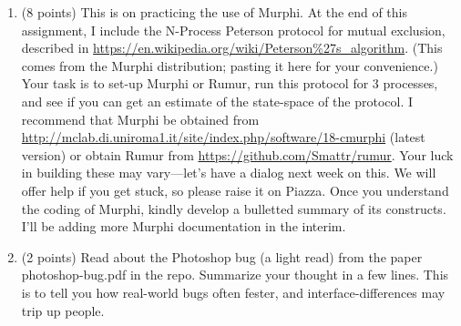 \documentclass[11pt]{article}
\begin{document}
\begin{enumerate}
  
\item (8 points)
  This is on practicing the use of Murphi.
  At the end of this assignment, I include the N-Process Peterson protocol
  for mutual exclusion, described in
  \url{https://en.wikipedia.org/wiki/Peterson%27s_algorithm}.
  (This comes from the Murphi distribution; pasting it here for your
  convenience.)
  Your task is to set-up Murphi or Rumur, run this protocol for 3 processes, and
  see if you can get an estimate of the state-space of the protocol.
  I recommend that Murphi be obtained from
  \url{http://mclab.di.uniroma1.it/site/index.php/software/18-cmurphi} (latest version)
  or obtain Rumur from
  \url{https://github.com/Smattr/rumur}.
  Your luck in building these may vary---let's have a dialog next week on this.
  We will offer help if you get stuck, so please raise it on Piazza.
  Once you understand the coding of Murphi, kindly develop a bulletted summary of its
  constructs.
  I'll be adding more Murphi documentation in the interim.


\begin{minipage}{\minpagw}
\end{minipage}
\item (2 points) Read about the Photoshop bug (a light read) from the paper photoshop-bug.pdf in the repo.
  Summarize your thought in a few lines. This is to tell you how real-world bugs often fester, and
  interface-differences may trip up people.
  

\end{enumerate}
\end{document}
